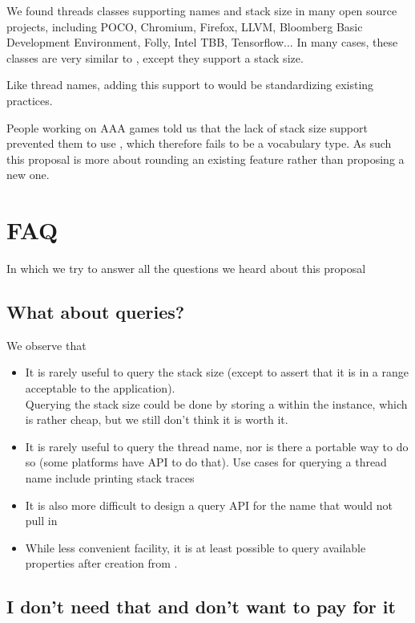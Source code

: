 \documentclass{wg21}
\begin{document}
We found threads classes supporting names and stack size in many open source projects, including POCO, Chromium, Firefox, LLVM, Bloomberg Basic Development Environment, Folly, Intel TBB, Tensorflow...
In many cases, these classes are very similar to , except they support a stack size.

Like thread names, adding this support to  would be standardizing existing practices.

People working on AAA games told us that the lack of stack size support prevented them to use , which therefore fails to be a vocabulary type.
As such this proposal is more about rounding an existing feature rather than proposing a new one.

\section{FAQ}

In which we try to answer all the questions we heard about this proposal

\subsection{What about queries?}

We observe that
\begin{itemize}
\item It is rarely useful to query the stack size (except to assert that it is in a range acceptable to the application).\\
Querying the stack size could be done by storing a  within the  instance, which is rather cheap,
but we still don't think it is worth it.
\item It is rarely useful to query the thread name, nor is there a portable way to do so (some platforms have API to do that). Use cases for querying a thread name include printing stack traces \cite{P0881R5}\\
\item It is also more difficult to design a query API for the name that would not pull in 
\item While less convenient facility, it is at least possible to query available properties after creation from .
\end{itemize}

\subsection{I don't need that and don't want to pay for it}
\end{document}
